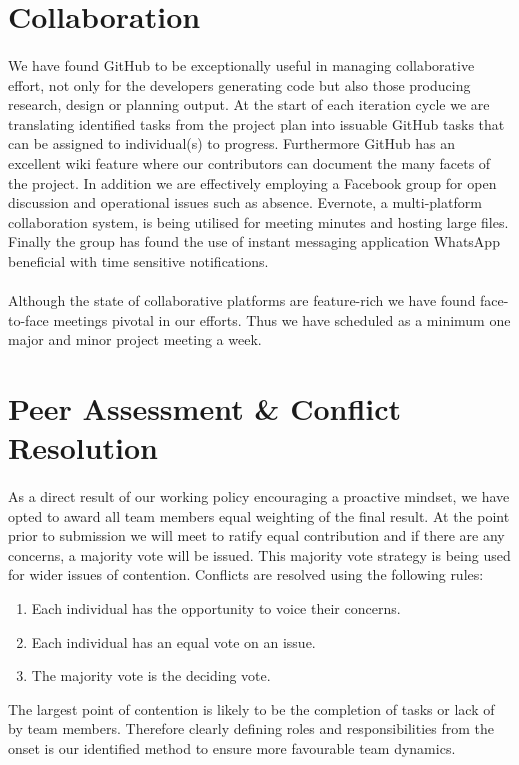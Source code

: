 \documentclass[11pt,a4paper]{article}
\begin{document}
\section{Collaboration}
\paragraph{}
We have found GitHub to be exceptionally useful in managing collaborative effort, not only for the developers generating code but also those producing research, design or planning output.  At the start of each iteration cycle we are translating identified tasks from the project plan into issuable GitHub tasks that can be assigned to individual(s) to progress.  Furthermore GitHub has an excellent wiki feature where our contributors can document the many facets of the project.
\newline
In addition we are effectively employing a Facebook group for open discussion and operational issues such as absence.  Evernote, a multi-platform collaboration system, is being utilised for meeting minutes and hosting large files.  Finally the group has found the use of instant messaging application WhatsApp beneficial with time sensitive notifications.
\paragraph{}
Although the state of collaborative platforms are feature-rich we have found face-to-face meetings pivotal in our efforts.  Thus we have scheduled as a minimum one major and minor project meeting a week.

\section{Peer Assessment \& Conflict Resolution}
\paragraph{}
As a direct result of our working policy encouraging a proactive mindset, we have opted to award all team members equal weighting of the final result.  At the point prior to submission we will meet to ratify equal contribution and if there are any concerns, a majority vote will be issued.
This majority vote strategy is being used for wider issues of contention.  Conflicts are resolved using the following rules:

\begin{enumerate}
  \item Each individual has the opportunity to voice their concerns.
  \item Each individual has an equal vote on an issue.
  \item The majority vote is the deciding vote.
\end{enumerate}

The largest point of contention is likely to be the completion of tasks or lack of by team members.  Therefore clearly defining roles and responsibilities from the onset is our identified method to ensure more favourable team dynamics.
\end{document}
